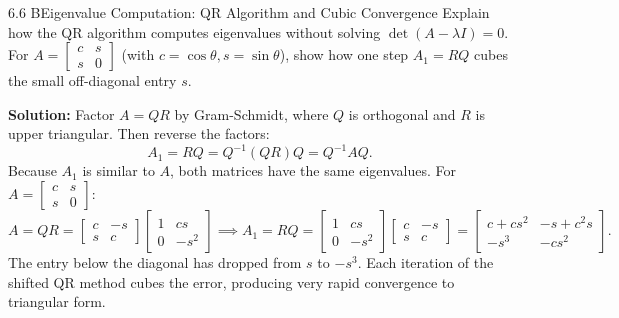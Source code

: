 \documentclass[11pt,a4paper,openany,oneside]{book}
\numberwithin{equation}{chapter}
\begin{document}
\begin{example}{6.6 B}{Eigenvalue Computation: QR Algorithm and Cubic Convergence}
Explain how the QR algorithm computes eigenvalues without solving $\det(A-\lambda I) = 0$. For $A = \begin{bmatrix} c & s \\ s & 0 \end{bmatrix}$ (with $c=\cos\theta, s=\sin\theta$), show how one step $A_1 = RQ$ cubes the small off-diagonal entry $s$.
\end{example}
\textbf{Solution:} Factor $A = QR$ by Gram-Schmidt, where $Q$ is orthogonal and $R$ is upper triangular. Then reverse the factors:
\[
A_1 = RQ = Q^{-1}(QR)Q = Q^{-1}AQ.
\]
Because $A_1$ is similar to $A$, both matrices have the same eigenvalues.
For $A = \begin{bmatrix} c & s \\ s & 0 \end{bmatrix}$:
\[
A = QR = \begin{bmatrix} c & -s \\ s & c \end{bmatrix}\begin{bmatrix} 1 & cs \\ 0 & -s^2 \end{bmatrix} \implies A_1 = RQ = \begin{bmatrix} 1 & cs \\ 0 & -s^2 \end{bmatrix}\begin{bmatrix} c & -s \\ s & c \end{bmatrix} = \begin{bmatrix} c + cs^2 & -s + c^2s \\ -s^3 & -cs^2 \end{bmatrix}.
\]
The entry below the diagonal has dropped from $s$ to $-s^3$. Each iteration of the shifted QR method cubes the error, producing very rapid convergence to triangular form.
\end{document}
